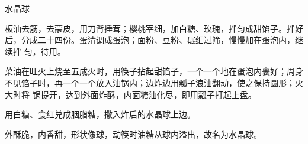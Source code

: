 %
%
%
%
%
%
%
\begin{recipe}{水晶球}

\ingredients


\preparation

\step 板油去筋，去蒙皮，用刀背捶茸；樱桃宰细，加白糖、玫瑰，拌匀成甜馅子。拌好
后，分成二十四份。蛋清调成蛋泡；面粉、豆粉、碾细过筛，慢慢加在蛋泡内，继续拌
匀，待用。

\step 菜油在旺火上烧至五成火时，用筷子拈起甜馅子，一个一个地在蛋泡内裹好；周身
不见馅子时，再一个一个放入油锅内；边炸边用瓢子浪油翻动，使之保持圆形；火大时将
锅提开，达到外面炸酥，内面糖油化尽，即用瓢子打起上盘。

\step 用白糖、食红兑成胭脂糖，撒入炸后的水晶球上边。

\features

外酥脆，内香甜，形状像球，动筷时油糖从球内溢出，故名为水晶球。

\end{recipe}

